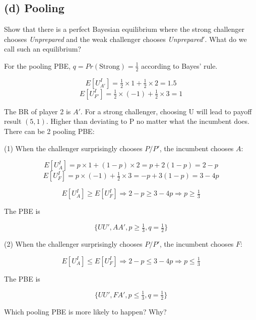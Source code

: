 \documentclass{article}
\begin{document}
\subsection*{(d) Pooling}Show that there is a perfect Bayesian equilibrium where the strong challenger chooses
\textit{Unprepared} and the weak challenger chooses \textit{Unprepared}$'$. What do we call such an
equilibrium? 


For the pooling PBE, $q=Pr(\text{Strong})= \tfrac12$ according to Bayes' rule.

$$E[U^I_{A'}] = \tfrac12 \times 1+ \tfrac12 \times 2 =1.5$$
$$E[U^I_{F'}] = \tfrac12  \times (-1)+ \tfrac12 \times 3 = 1 $$

The BR of player 2 is $A'$. For a strong challenger, choosing U will lead to payoff result $(5,1)$. Higher than deviating to P no matter what the incumbent does. There can be 2 pooling PBE:

\medskip

(1) When the challenger surprisingly chooses $P/P'$, the incumbent chooses $A$:

$$E[U^I_{A}] = p \times 1+ (1-p)\times 2 = p + 2(1-p) = 2 - p$$
$$E[U^I_{F}] = p \times (-1)+ \tfrac12 \times 3 = -p + 3(1-p) = 3 - 4p$$

$$E[U^I_{A}] \ge E[U^I_{F}] \Rightarrow 2-p \ge 3-4p \Rightarrow p \ge \tfrac13$$

The PBE is

$$\{UU',AA',p \ge \tfrac13, q=\tfrac12\}$$

\medskip

(2) When the challenger surprisingly chooses $P/P'$, the incumbent chooses $F$:

$$E[U^I_{A}] \le E[U^I_{F}] \Rightarrow 2-p \le 3-4p \Rightarrow p \le \tfrac13$$

The PBE is

$$\{UU',FA',p \le \tfrac13, q=\tfrac12\}$$

\begin{mdframed}[backgroundcolor=blue!20,linecolor=white]
Which pooling PBE is more likely to happen? Why?
\end{mdframed}
\end{document}
